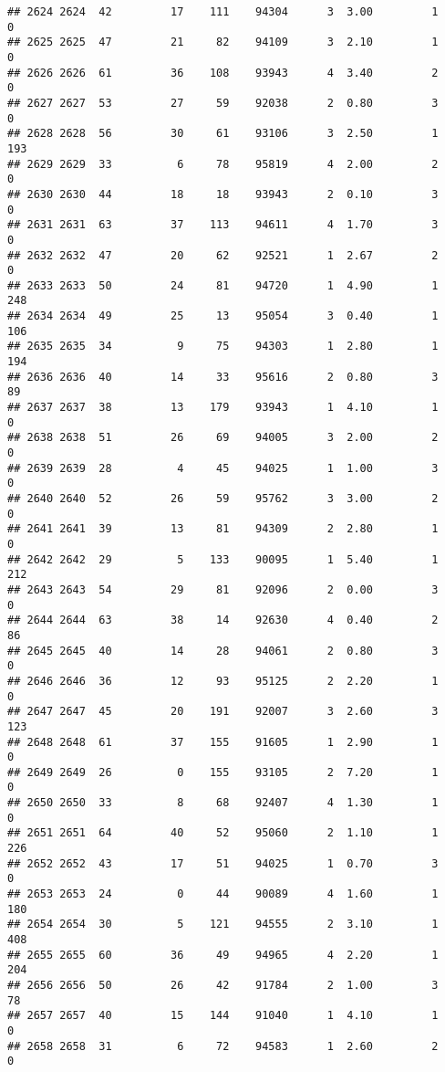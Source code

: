 \documentclass[
]{article}
\begin{document}
\begin{verbatim}
## 2624 2624  42         17    111    94304      3  3.00         1        0
## 2625 2625  47         21     82    94109      3  2.10         1        0
## 2626 2626  61         36    108    93943      4  3.40         2        0
## 2627 2627  53         27     59    92038      2  0.80         3        0
## 2628 2628  56         30     61    93106      3  2.50         1      193
## 2629 2629  33          6     78    95819      4  2.00         2        0
## 2630 2630  44         18     18    93943      2  0.10         3        0
## 2631 2631  63         37    113    94611      4  1.70         3        0
## 2632 2632  47         20     62    92521      1  2.67         2        0
## 2633 2633  50         24     81    94720      1  4.90         1      248
## 2634 2634  49         25     13    95054      3  0.40         1      106
## 2635 2635  34          9     75    94303      1  2.80         1      194
## 2636 2636  40         14     33    95616      2  0.80         3       89
## 2637 2637  38         13    179    93943      1  4.10         1        0
## 2638 2638  51         26     69    94005      3  2.00         2        0
## 2639 2639  28          4     45    94025      1  1.00         3        0
## 2640 2640  52         26     59    95762      3  3.00         2        0
## 2641 2641  39         13     81    94309      2  2.80         1        0
## 2642 2642  29          5    133    90095      1  5.40         1      212
## 2643 2643  54         29     81    92096      2  0.00         3        0
## 2644 2644  63         38     14    92630      4  0.40         2       86
## 2645 2645  40         14     28    94061      2  0.80         3        0
## 2646 2646  36         12     93    95125      2  2.20         1        0
## 2647 2647  45         20    191    92007      3  2.60         3      123
## 2648 2648  61         37    155    91605      1  2.90         1        0
## 2649 2649  26          0    155    93105      2  7.20         1        0
## 2650 2650  33          8     68    92407      4  1.30         1        0
## 2651 2651  64         40     52    95060      2  1.10         1      226
## 2652 2652  43         17     51    94025      1  0.70         3        0
## 2653 2653  24          0     44    90089      4  1.60         1      180
## 2654 2654  30          5    121    94555      2  3.10         1      408
## 2655 2655  60         36     49    94965      4  2.20         1      204
## 2656 2656  50         26     42    91784      2  1.00         3       78
## 2657 2657  40         15    144    91040      1  4.10         1        0
## 2658 2658  31          6     72    94583      1  2.60         2        0

\end{verbatim}
\end{document}
